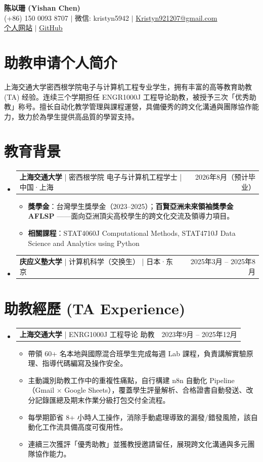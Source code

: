 \documentclass[UTF8,a4paper,10pt]{ctexart}
\makeatletter
\newcommand{\resumeItem}[1]{\item\small{\linespread{1.1}\selectfont #1\par}\vspace{-0.5pt}}
\newcommand{\resumeProjectHeading}[2]{%
  \item
  \begin{tabular*}{0.97\textwidth}{l@{\extracolsep{\fill}}r}
    \normalsize #1 & #2 \\
  \end{tabular*}\vspace{-4pt}
}
\newcommand{\resumeSubHeadingListStart}{\begin{itemize}[label={}, leftmargin=0.15in]}
\newcommand{\resumeSubHeadingListEnd}{\end{itemize}}
\newcommand{\resumeItemListStart}{\begin{itemize}[label=\tiny$\bullet$, itemsep=0pt, topsep=3pt, parsep=0pt]}
\newcommand{\resumeItemListEnd}{\end{itemize}\vspace{-6pt}}
\makeatother
\begin{document}
\begin{center}
  \textbf{\large \heiti 陈以珊 (Yishan Chen)} \\ \vspace{1pt}
  \small (+86) 150 0093 8707 $|$ 微信: kristyn5942 $|$ \href{mailto:Kristyn921207@gmail.com}{Kristyn921207@gmail.com} \\ \vspace{1pt}
  \href{https://kristynchen.github.io/Personal-Website/}{\underline{个人网站}} $|$ \href{https://github.com/kristynchen}{\underline{GitHub}}
\end{center}
\vspace{-12pt}

\section{助教申请个人简介}
\small {上海交通大学密西根学院电子与计算机工程专业学生，拥有丰富的高等教育助教 (TA) 经验。连续三个学期担任 ENGR1000J 工程导论助教，被授予三次「优秀助教」称号。擅长自动化教学管理與課程運營，具備優秀的跨文化溝通與團隊協作能力，致力於為學生提供高品質的學習支持。}
\vspace{-4pt}

\section{教育背景}
\resumeSubHeadingListStart
  \resumeProjectHeading
    {\textbf{上海交通大学} \quad \quad | \quad 密西根学院 电子与计算机工程学士 \quad | \quad 中国·上海 }{2026年8月（预计毕业）}
    \resumeItemListStart
      \resumeItem{\textbf{獎學金}：台灣學生獎學金（2023--2025）；\textbf{百賢亞洲未來領袖獎學金 AFLSP }——面向亞洲頂尖高校學生的跨文化交流及領導力項目。}
      \resumeItem{\textbf{相關課程}：STAT4060J Computational Methods, STAT4710J Data Science and Analytics using Python}
    \resumeItemListEnd

  \resumeProjectHeading
    {\textbf{庆应义塾大学} \quad \quad | \quad 计算机科学（交换生） \quad | \quad 日本·东京}{2025年3月 -- 2025年8月}
\resumeSubHeadingListEnd

\section{助教經歷 (TA Experience)}
\resumeSubHeadingListStart
  \resumeProjectHeading
    {\textbf{上海交通大学} \quad | \quad ENRG1000J 工程导论 助教}{2023年9月 -- 2025年12月}
    \resumeItemListStart
      \resumeItem{帶領 60+ 名本地與國際混合班學生完成每週 Lab 課程，負責講解實驗原理、指導代碼編寫及操作安全。}
      \resumeItem{主動識別助教工作中的重複性痛點，自行構建 n8n 自動化 Pipeline（Gmail $\times$ Google Sheets），覆蓋學生評量解析、合格證書自動發送、改分記錄匯總及期末作業分級打包交付全流程。}
      \resumeItem{每學期節省 8+ 小時人工操作，消除手動處理導致的漏發/錯發風險，該自動化工作流具備高度可復用性。}
      \resumeItem{連續三次獲評「優秀助教」並獲教授邀請留任，展現跨文化溝通與多元團隊協作能力。}
    \resumeItemListEnd
\resumeSubHeadingListEnd
\end{document}
